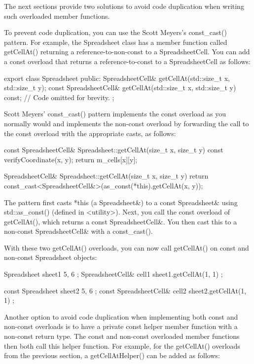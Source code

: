 The next sections provide two solutions to avoid code duplication when writing such overloaded member functions.


To prevent code duplication, you can use the Scott Meyers’s const\_cast() pattern. For example, the Spreadsheet class has a member function called getCellAt() returning a reference-to-non-const to a SpreadsheetCell. You can add a const overload that returns a reference-to-const to a SpreadsheetCell as follows:

\begin{cpp}
export class Spreadsheet
{
    public:
        SpreadsheetCell& getCellAt(std::size_t x, std::size_t y);
        const SpreadsheetCell& getCellAt(std::size_t x, std::size_t y) const;
        // Code omitted for brevity.
};
\end{cpp}

Scott Meyers’ const\_cast() pattern implements the const overload as you normally would and implements the non-const overload by forwarding the call to the const overload with the appropriate casts, as follows:

\begin{cpp}
const SpreadsheetCell& Spreadsheet::getCellAt(size_t x, size_t y) const
{
    verifyCoordinate(x, y);
    return m_cells[x][y];
}

SpreadsheetCell& Spreadsheet::getCellAt(size_t x, size_t y)
{
    return const_cast<SpreadsheetCell&>(as_const(*this).getCellAt(x, y));
}
\end{cpp}

The pattern first casts *this (a Spreadsheet\&) to a const Spreadsheet\& using std::as\_const() (defined in <utility>). Next, you call the const overload of getCellAt(), which returns a const SpreadsheetCell\&. You then cast this to a non-const SpreadsheetCell\& with a const\_cast().

With these two getCellAt() overloads, you can now call getCellAt() on const and non-const Spreadsheet objects:

\begin{cpp}
Spreadsheet sheet1 { 5, 6 };
SpreadsheetCell& cell1 { sheet1.getCellAt(1, 1) };

const Spreadsheet sheet2 { 5, 6 };
const SpreadsheetCell& cell2 { sheet2.getCellAt(1, 1) };
\end{cpp}


Another option to avoid code duplication when implementing both const and non-const overloads is to have a private const helper member function with a non-const return type. The const and non-const overloaded member functions then both call this helper function. For example, for the getCellAt() overloads from the previous section, a getCellAtHelper() can be added as follows:

